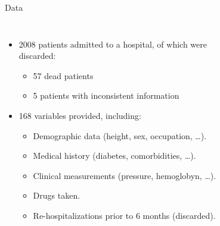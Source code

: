\documentclass[aspectratio=169,xcolor=dvipsnames,handout]{beamer}
\begin{document}
\begin{frame}{Data}
    \begin{columns}[t]
        \begin{itemize}
            \item 2008 patients admitted to a hospital, of which were discarded:
            \begin{itemize}
                \item 57 dead patients
                \item 5 patients with inconsistent information
            \end{itemize}
            
            \item 168 variables provided, including:
            \begin{itemize}
                \item Demographic data (height, sex, occupation, \ldots).
                \item Medical history (diabetes, comorbidities, \ldots).
                \item Clinical measurements (pressure, hemoglobyn, \ldots).
                \item Drugs taken.
                \item Re-hospitalizations prior to 6 months (discarded).
            \end{itemize}
        \end{itemize}
        \pause

        \begin{figure}
        \centering


\end{figure}
\end{columns}
\end{frame}
\end{document}
